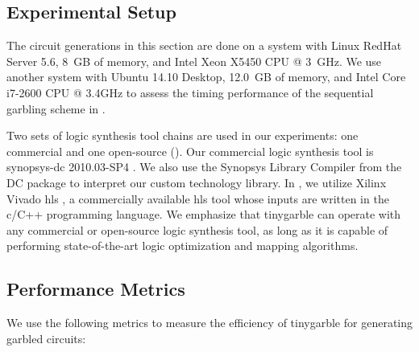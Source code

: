 \subsection{Experimental Setup}\label{ssec:eval-tinygarble-setup}
The circuit generations in this section are done on a system with Linux RedHat Server 5.6, 8~GB of memory, and Intel Xeon X5450 CPU @ 3~GHz.
We use another system with Ubuntu 14.10 Desktop, 12.0~GB of memory, and Intel Core i7-2600 CPU @ 3.4GHz to assess the timing performance of the sequential garbling scheme in .

Two sets of logic synthesis tool chains are used in our experiments: one commercial and one open-source ().
Our commercial logic synthesis tool is \gls{synopsys-dc} 2010.03-SP4 \cite{tool:DesignCompiler}.
We also use the Synopsys Library Compiler from the DC package to interpret our custom technology library.
In , we utilize Xilinx Vivado \acrshort{hls} \cite{tool:Vivado}, a commercially available \acrshort{hls} tool whose inputs are written in the \gls{c}/C++ programming language.
We emphasize that \gls{tinygarble} can operate with any commercial or open-source logic synthesis tool, as long as it is capable of performing state-of-the-art logic optimization and mapping algorithms.

\subsection{Performance Metrics}\label{ssec:eval-tinygarble-metric}
We use the following metrics to measure the efficiency of \gls{tinygarble} for generating garbled circuits:

